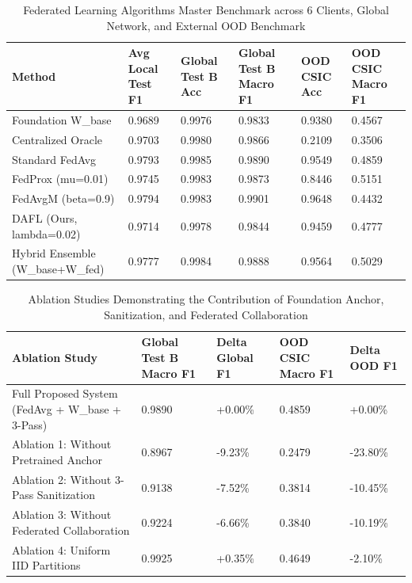 
\begin{table}[htbp]
\centering
\caption{Federated Learning Algorithms Master Benchmark across 6 Clients, Global Network, and External OOD Benchmark}
\label{tab:federated_benchmark}
\begin{tabular}{llllll}
\toprule
\textbf{Method} & \textbf{Avg Local Test F1} & \textbf{Global Test B Acc} & \textbf{Global Test B Macro F1} & \textbf{OOD CSIC Acc} & \textbf{OOD CSIC Macro F1} \\
\midrule
Foundation W\_base & 0.9689 & 0.9976 & 0.9833 & 0.9380 & 0.4567 \\
Centralized Oracle & 0.9703 & 0.9980 & 0.9866 & 0.2109 & 0.3506 \\
Standard FedAvg & 0.9793 & 0.9985 & 0.9890 & 0.9549 & 0.4859 \\
FedProx (mu=0.01) & 0.9745 & 0.9983 & 0.9873 & 0.8446 & 0.5151 \\
FedAvgM (beta=0.9) & 0.9794 & 0.9983 & 0.9901 & 0.9648 & 0.4432 \\
DAFL (Ours, lambda=0.02) & 0.9714 & 0.9978 & 0.9844 & 0.9459 & 0.4777 \\
Hybrid Ensemble (W\_base+W\_fed) & 0.9777 & 0.9984 & 0.9888 & 0.9564 & 0.5029 \\
\bottomrule
\end{tabular}
\end{table}

\begin{table}[htbp]
\centering
\caption{Ablation Studies Demonstrating the Contribution of Foundation Anchor, Sanitization, and Federated Collaboration}
\label{tab:ablation_studies}
\begin{tabular}{lllll}
\toprule
\textbf{Ablation Study} & \textbf{Global Test B Macro F1} & \textbf{Delta Global F1} & \textbf{OOD CSIC Macro F1} & \textbf{Delta OOD F1} \\
\midrule
Full Proposed System (FedAvg + W\_base + 3-Pass) & 0.9890 & +0.00\% & 0.4859 & +0.00\% \\
Ablation 1: Without Pretrained Anchor & 0.8967 & -9.23\% & 0.2479 & -23.80\% \\
Ablation 2: Without 3-Pass Sanitization & 0.9138 & -7.52\% & 0.3814 & -10.45\% \\
Ablation 3: Without Federated Collaboration & 0.9224 & -6.66\% & 0.3840 & -10.19\% \\
Ablation 4: Uniform IID Partitions & 0.9925 & +0.35\% & 0.4649 & -2.10\% \\
\bottomrule
\end{tabular}
\end{table}

